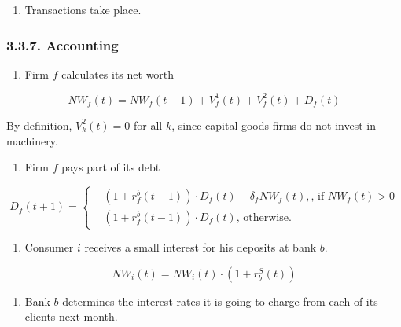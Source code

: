 \documentclass[11pt,]{article}
\providecommand{\tightlist}{%
\setlength{\itemsep}{0pt}\setlength{\parskip}{0pt}}
\begin{document}
\begin{enumerate}
\def\labelenumi{\alph{enumi}.}
\setcounter{enumi}{4}
\tightlist
\item
  Transactions take place.
\end{enumerate}

\subsubsection{3.3.7. Accounting}\label{accounting}

\begin{enumerate}
\def\labelenumi{\alph{enumi}.}
\tightlist
\item
  Firm \(f\) calculates its net worth
\end{enumerate}

\begin{equation}
  NW_f(t) = NW_f(t-1) + V^1_f(t) + V^2_f(t) + D_f(t)
\end{equation}

By definition, \(V^2_k(t) = 0\) for all \(k\), since capital goods firms
do not invest in machinery.

\begin{enumerate}
\def\labelenumi{\alph{enumi}.}
\setcounter{enumi}{1}
\tightlist
\item
  Firm \(f\) pays part of its debt
\end{enumerate}

\begin{equation}
  D_f(t+1) =
  \begin{cases}
    & (1 + r_f^b(t-1))\cdot D_f(t) - \delta_f NW_f(t), \text{, if } NW_f(t) > 0\\
    & (1 + r_f^b(t-1))\cdot D_f(t) \text{, otherwise.}
  \end{cases}
\end{equation}

\begin{enumerate}
\def\labelenumi{\alph{enumi}.}
\setcounter{enumi}{2}
\tightlist
\item
  Consumer \(i\) receives a small interest for his deposits at bank
  \(b\).
\end{enumerate}

\begin{equation}
NW_i(t) = NW_i(t)\cdot (1 + r^S_b(t))
\end{equation}

\begin{enumerate}
\def\labelenumi{\alph{enumi}.}
\setcounter{enumi}{3}
\tightlist
\item
  Bank \(b\) determines the interest rates it is going to charge from
  each of its clients next month.
\end{enumerate}
\end{document}
